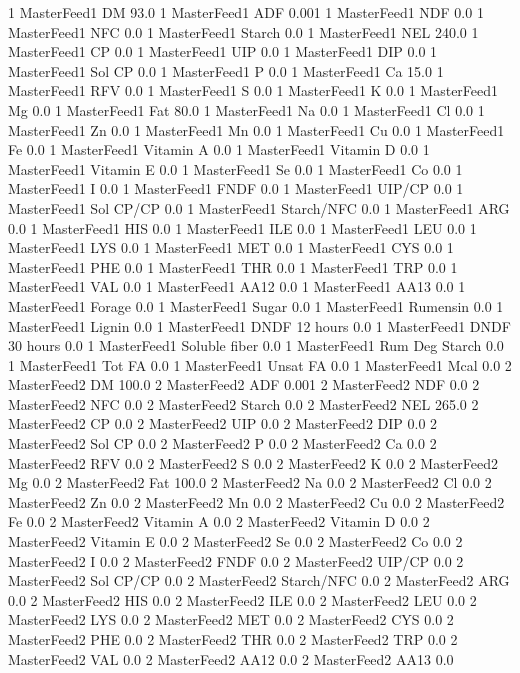 \documentclass[letterpaper,10pt,english]{sphinxmanual}
\begin{document}
\begin{sphinxVerbatim}[commandchars=\\\{\},numbers=left,firstnumber=1,stepnumber=1]
1 MasterFeed1 DM 93.0
1 MasterFeed1 ADF 0.001
1 MasterFeed1 NDF 0.0
1 MasterFeed1 NFC 0.0
1 MasterFeed1 Starch 0.0
1 MasterFeed1 NEL 240.0
1 MasterFeed1 CP 0.0
1 MasterFeed1 UIP 0.0
1 MasterFeed1 DIP 0.0
1 MasterFeed1 Sol CP 0.0
1 MasterFeed1 P 0.0
1 MasterFeed1 Ca 15.0
1 MasterFeed1 RFV 0.0
1 MasterFeed1 S 0.0
1 MasterFeed1 K 0.0
1 MasterFeed1 Mg 0.0
1 MasterFeed1 Fat 80.0
1 MasterFeed1 Na 0.0
1 MasterFeed1 Cl 0.0
1 MasterFeed1 Zn 0.0
1 MasterFeed1 Mn 0.0
1 MasterFeed1 Cu 0.0
1 MasterFeed1 Fe 0.0
1 MasterFeed1 Vitamin A 0.0
1 MasterFeed1 Vitamin D 0.0
1 MasterFeed1 Vitamin E 0.0
1 MasterFeed1 Se 0.0
1 MasterFeed1 Co 0.0
1 MasterFeed1 I 0.0
1 MasterFeed1 FNDF 0.0
1 MasterFeed1 UIP/CP 0.0
1 MasterFeed1 Sol CP/CP 0.0
1 MasterFeed1 Starch/NFC 0.0
1 MasterFeed1 ARG 0.0
1 MasterFeed1 HIS 0.0
1 MasterFeed1 ILE 0.0
1 MasterFeed1 LEU 0.0
1 MasterFeed1 LYS 0.0
1 MasterFeed1 MET 0.0
1 MasterFeed1 CYS 0.0
1 MasterFeed1 PHE 0.0
1 MasterFeed1 THR 0.0
1 MasterFeed1 TRP 0.0
1 MasterFeed1 VAL 0.0
1 MasterFeed1 AA\PYGZsh{}12 0.0
1 MasterFeed1 AA\PYGZsh{}13 0.0
1 MasterFeed1 \PYGZpc{} Forage 0.0
1 MasterFeed1 Sugar \PYGZpc{} 0.0
1 MasterFeed1 Rumensin 0.0
1 MasterFeed1 Lignin 0.0
1 MasterFeed1 DNDF 12 hours 0.0
1 MasterFeed1 DNDF 30 hours 0.0
1 MasterFeed1 Soluble fiber 0.0
1 MasterFeed1 Rum Deg Starch 0.0
1 MasterFeed1 Tot FA 0.0
1 MasterFeed1 Unsat FA 0.0
1 MasterFeed1 Mcal 0.0
2 MasterFeed2 DM 100.0
2 MasterFeed2 ADF 0.001
2 MasterFeed2 NDF 0.0
2 MasterFeed2 NFC 0.0
2 MasterFeed2 Starch 0.0
2 MasterFeed2 NEL 265.0
2 MasterFeed2 CP 0.0
2 MasterFeed2 UIP 0.0
2 MasterFeed2 DIP 0.0
2 MasterFeed2 Sol CP 0.0
2 MasterFeed2 P 0.0
2 MasterFeed2 Ca 0.0
2 MasterFeed2 RFV 0.0
2 MasterFeed2 S 0.0
2 MasterFeed2 K 0.0
2 MasterFeed2 Mg 0.0
2 MasterFeed2 Fat 100.0
2 MasterFeed2 Na 0.0
2 MasterFeed2 Cl 0.0
2 MasterFeed2 Zn 0.0
2 MasterFeed2 Mn 0.0
2 MasterFeed2 Cu 0.0
2 MasterFeed2 Fe 0.0
2 MasterFeed2 Vitamin A 0.0
2 MasterFeed2 Vitamin D 0.0
2 MasterFeed2 Vitamin E 0.0
2 MasterFeed2 Se 0.0
2 MasterFeed2 Co 0.0
2 MasterFeed2 I 0.0
2 MasterFeed2 FNDF 0.0
2 MasterFeed2 UIP/CP 0.0
2 MasterFeed2 Sol CP/CP 0.0
2 MasterFeed2 Starch/NFC 0.0
2 MasterFeed2 ARG 0.0
2 MasterFeed2 HIS 0.0
2 MasterFeed2 ILE 0.0
2 MasterFeed2 LEU 0.0
2 MasterFeed2 LYS 0.0
2 MasterFeed2 MET 0.0
2 MasterFeed2 CYS 0.0
2 MasterFeed2 PHE 0.0
2 MasterFeed2 THR 0.0
2 MasterFeed2 TRP 0.0
2 MasterFeed2 VAL 0.0
2 MasterFeed2 AA\PYGZsh{}12 0.0
2 MasterFeed2 AA\PYGZsh{}13 0.0

\end{sphinxVerbatim}
\end{document}
